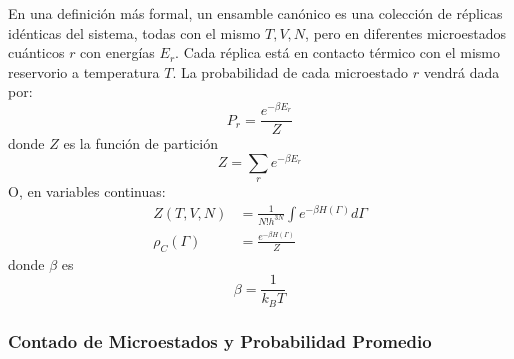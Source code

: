 \documentclass[]{article}
\numberwithin{equation}{section}
\newcommand{\0}{\textcolor{gray}{0}}
\begin{document}
En una definición más formal, un ensamble canónico es una colección de réplicas idénticas del sistema, todas con el mismo \(T, V, N\), pero en diferentes microestados cuánticos \(r\) con energías \(E_r\). Cada réplica está en contacto térmico con el mismo reservorio a temperatura \(T\). La probabilidad de cada microestado \(r\) vendrá dada por:
\begin{equation}
	P_r = \frac{e^{-\beta E_r}}{Z}\label{prob_can}
\end{equation}
donde \(Z\) es la función de partición
\begin{equation}
	Z = \sum_{r} e^{-\beta E_r}\label{Z}
\end{equation}
O, en variables continuas:
\begin{align}
	Z(T,V,N) &= \frac{1}{N! h^{3N}}\int e^{-\beta H(\Gamma)}d\Gamma\\
	\rho_C(\Gamma) &= \frac{e^{-\beta H(\Gamma)}}{Z}
\end{align}
donde \(\beta\) es
\begin{equation}
	\beta = \frac{1}{k_B T}\label{beta}
\end{equation}

\subsubsection{Contado de Microestados y Probabilidad Promedio}
\end{document}
